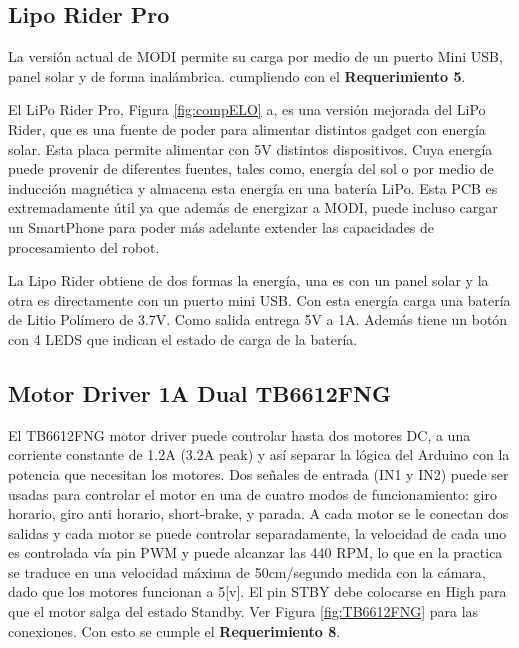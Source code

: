 \subsection{Lipo Rider Pro}
 La versión actual de MODI permite su carga por medio de un puerto Mini USB, panel solar y de forma inalámbrica. cumpliendo con el \textbf{Requerimiento 5}.

El LiPo Rider Pro, Figura \ref{fig:compELO} a, es una versión mejorada del LiPo Rider, que es una fuente de poder para alimentar distintos gadget con energía solar. Esta placa permite alimentar con 5V distintos dispositivos. Cuya energía puede provenir de diferentes fuentes, tales como, energía del sol o por medio de inducción magnética y almacena esta energía en una batería LiPo. Esta PCB es extremadamente útil ya que además de energizar a MODI, puede incluso cargar un SmartPhone para poder más adelante extender las capacidades de procesamiento del robot.

La Lipo Rider obtiene de dos formas la energía, una es con un panel solar y la otra es directamente con un puerto mini USB. Con esta energía carga una batería de Litio Polímero de 3.7V. Como salida entrega 5V a 1A. Además tiene un botón con 4 LEDS que indican el estado de carga de la batería.

\subsection{Motor Driver 1A Dual TB6612FNG}
El TB6612FNG motor driver puede controlar hasta dos motores DC, a una corriente constante de 1.2A (3.2A peak) y así separar la lógica del Arduino con la potencia que necesitan los motores. Dos señales de entrada (IN1 y IN2) puede ser usadas para controlar el motor en una de cuatro modos de funcionamiento: giro horario, giro anti horario, short-brake, y parada. A cada motor se le conectan dos salidas y cada motor se puede controlar separadamente, la velocidad de cada uno es controlada vía pin PWM y puede alcanzar las 440 RPM, lo que en la practica se traduce en una velocidad máxima de 50cm/segundo medida con la cámara, dado que los motores funcionan a 5[v]. El pin STBY debe colocarse en High para que el motor salga del estado Standby. Ver Figura  \ref{fig:TB6612FNG} para las conexiones. Con esto se cumple el \textbf{Requerimiento 8}.

